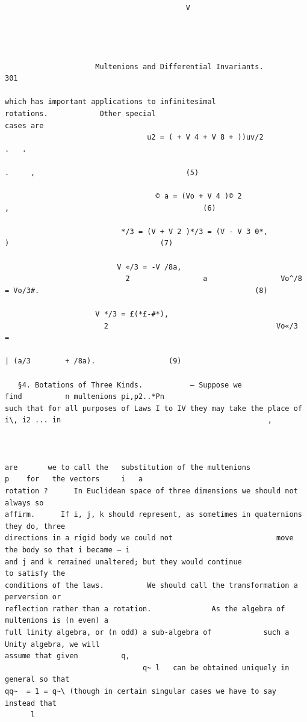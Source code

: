 \documentclass[10pt]{article}
\begin{document}
\clearpage
\begin{verbatim}

                                          V




                     Multenions and Differential Invariants.                                                                  301

which has important applications to infinitesimal                                           rotations.            Other special
cases are
                                 u2 = ( + V 4 + V 8 + ))uv/2                  .   .
                                                                                      .     ,                                   (5)

                                   © a = (Vo + V 4 )© 2                           ,                                             (6)

                           */3 = (V + V 2 )*/3 = (V - V 3 0*,                               )                                   (7)

                          V «/3 = -V /8a,
                            2                 a                 Vo^/8 = Vo/3#.                                                  (8)

                     V */3 = £(*£-#*),
                       2                                       Vo«/3              =
                                                                                          | (a/3        + /8a).                 (9)

   §4. Botations of Three Kinds.           — Suppose we                           find          n multenions pi,p2..*Pn
such that for all purposes of Laws I to IV they may take the place of i\, i2 ... in                                                ,



are       we to call the   substitution of the multenions                                           p    for   the vectors     i   a
rotation ?      In Euclidean space of three dimensions we should not always so
affirm.      If i, j, k should represent, as sometimes in quaternions they do, three
directions in a rigid body we could not                        move the body so that i became — i
and j and k remained unaltered; but they would continue                                                           to satisfy the
conditions of the laws.          We should call the transformation a perversion or
reflection rather than a rotation.              As the algebra of multenions is (n even) a
full linity algebra, or (n odd) a sub-algebra of            such a Unity algebra, we will
assume that given          q,
                                q~ l   can be obtained uniquely in general so that
qq~  = 1 = q~\ (though in certain singular cases we have to say instead that
      l




\end{verbatim}
\end{document}
